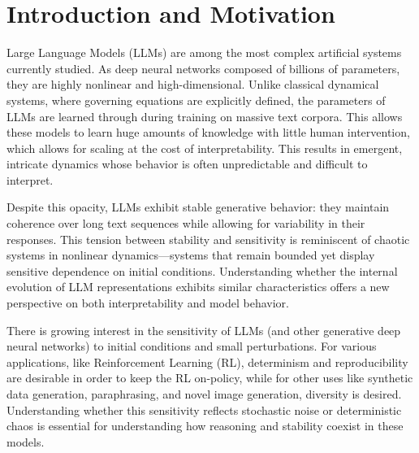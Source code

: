 \documentclass[a4paper,12pt]{article}
\begin{document}
\section{Introduction and Motivation}
\label{sec:introduction}
Large Language Models (LLMs) are among the most complex artificial systems currently studied. As deep neural networks composed of billions of parameters, they are highly nonlinear and high-dimensional. Unlike classical dynamical systems, where governing equations are explicitly defined, the parameters of LLMs are learned through during training on massive text corpora. This allows these models to learn huge amounts of knowledge with little human intervention, which allows for scaling at the cost of interpretability. This results in emergent, intricate dynamics whose behavior is often unpredictable and difficult to interpret.

Despite this opacity, LLMs exhibit stable generative behavior: they maintain coherence over long text sequences while allowing for variability in their responses. This tension between stability and sensitivity is reminiscent of chaotic systems in nonlinear dynamics—systems that remain bounded yet display sensitive dependence on initial conditions. Understanding whether the internal evolution of LLM representations exhibits similar characteristics offers a new perspective on both interpretability and model behavior.

There is growing interest in the sensitivity of LLMs (and other generative deep neural networks) to initial conditions and small perturbations. For various applications, like Reinforcement Learning (RL), determinism and reproducibility are desirable in order to keep the RL on-policy, while for other uses like synthetic data generation, paraphrasing, and novel image generation, diversity is desired. Understanding whether this sensitivity reflects stochastic noise or deterministic chaos is essential for understanding how reasoning and stability coexist in these models.
\end{document}
